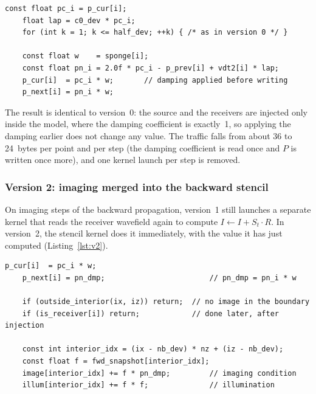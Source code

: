 \documentclass[letterpaper,11pt,leqno]{article}
\begin{document}
\noindent\begin{minipage}{\linewidth}
\begin{lstlisting}[style=cuda, caption={Version 1: the damping is applied in the stencil kernel.}, label={lst:v1}]
    const float pc_i = p_cur[i];
    float lap = c0_dev * pc_i;
    for (int k = 1; k <= half_dev; ++k) { /* as in version 0 */ }

    const float w    = sponge[i];
    const float pn_i = 2.0f * pc_i - p_prev[i] + vdt2[i] * lap;
    p_cur[i]  = pc_i * w;       // damping applied before writing
    p_next[i] = pn_i * w;
\end{lstlisting}
\end{minipage}

The result is identical to version~0: the source and the receivers are
injected only inside the model, where the damping coefficient is exactly~1,
so applying the damping earlier does not change any value. The traffic falls
from about 36 to 24~bytes per point and per step (the damping coefficient is
read once and $P$ is written once more), and one kernel launch per step is
removed.

\subsubsection{Version 2: imaging merged into the backward stencil}

On imaging steps of the backward propagation, version~1 still launches a
separate kernel that reads the receiver wavefield again to compute
$I \gets I + S_t \cdot R$. In version~2, the stencil kernel does it
immediately, with the value it has just computed (Listing~\ref{lst:v2}).

\noindent\begin{minipage}{\linewidth}
\begin{lstlisting}[style=cuda, caption={Version 2: end of the backward stencil kernel on imaging steps.}, label={lst:v2}]
    p_cur[i]  = pc_i * w;
    p_next[i] = pn_dmp;                        // pn_dmp = pn_i * w

    if (outside_interior(ix, iz)) return;  // no image in the boundary
    if (is_receiver[i]) return;            // done later, after injection

    const int interior_idx = (ix - nb_dev) * nz + (iz - nb_dev);
    const float f = fwd_snapshot[interior_idx];
    image[interior_idx] += f * pn_dmp;         // imaging condition
    illum[interior_idx] += f * f;              // illumination
\end{lstlisting}
\end{minipage}
\end{document}
